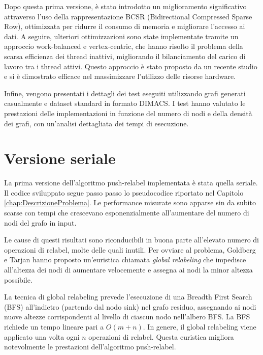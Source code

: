     Dopo questa prima versione, è stato introdotto un miglioramento significativo attraverso l'uso della rappresentazione BCSR (Bidirectional Compressed Sparse Row), ottimizzata per ridurre il consumo di memoria e migliorare l'accesso ai dati. A seguire, ulteriori ottimizzazioni sono state implementate tramite un approccio work-balanced e vertex-centric, che hanno risolto il problema della scarsa efficienza dei thread inattivi, migliorando il bilanciamento del carico di lavoro tra i thread attivi. Questo approccio è stato proposto da un recente studio \cite{EngineeringWorkload2024} e si è dimostrato efficace nel massimizzare l'utilizzo delle risorse hardware.
    
    Infine, vengono presentati i dettagli dei test eseguiti utilizzando grafi generati casualmente e dataset standard in formato DIMACS. I test hanno valutato le prestazioni delle implementazioni in funzione del numero di nodi e della densità dei grafi, con un'analisi dettagliata dei tempi di esecuzione.


    \section{Versione seriale}

        La prima versione dell'algoritmo push-relabel implementata è stata quella seriale. Il codice sviluppato segue passo passo lo pseudocodice riportato nel Capitolo \ref{chap:DescrizioneProblema}.
        Le performance misurate sono apparse sin da subito scarse con tempi che crescevano esponenzialmente all'aumentare del numero di nodi del grafo in input.

        Le cause di questi risultati sono riconducibili in buona parte all'elevato numero di operazioni di relabel, molte delle quali inutili. 
        Per ovviare al problema, Goldberg e Tarjan hanno proposto un'euristica chiamata \textit{global relabeling} \cite{PushRelabel} che impedisce all'altezza dei nodi di aumentare velocemente e assegna ai nodi la minor altezza possibile.

        La tecnica di global relabeling prevede l'esecuzione di una Breadth First Search (BFS) all'indietro (partendo dal nodo sink) nel grafo residuo, assegnando ai nodi nuove altezze corrispondenti al livello di ciascun nodo nell'albero BFS. La BFS richiede un tempo lineare pari a $O(m + n)$. In genere, il global relabeling viene applicato una volta ogni $n$ operazioni di relabel. Questa euristica migliora notevolmente le prestazioni dell'algoritmo push-relabel.

